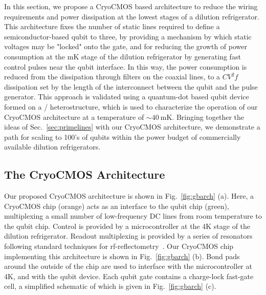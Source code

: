 In this section, we propose a CryoCMOS based architecture to reduce the wiring requirements and power dissipation at the lowest stages of a dilution refrigerator. This architecture
fixes the number of static lines required to define a semiconductor-based qubit to three, by providing a mechanism by which static voltages may be "locked" onto the gate, and for
reducing the growth of power consumption at the mK stage of the dilution refrigerator by generating fast control pulses near the qubit interface. In this way, the power
consumption is reduced from the dissipation through filters on the coaxial lines, to a $CV^2f$ dissipation set by the length of the interconnect between the qubit and the pulse
generator. This approach is validated using a quantum-dot based qubit device formed on a / heterostructure, which is used to characterize the operation of
our CryoCMOS architecture at a temperature of $\sim \SI{40}{\milli\kelvin}$. Bringing together the ideas of Sec.~\ref{sec:primelines} with our CryoCMOS architecture, we demonstrate
a path for scaling to 100's of qubits within the power budget of commercially available dilution refrigerators.

\subsection{The CryoCMOS Architecture}
\label{sec:gbarch}

Our proposed CryoCMOS architecture is shown in Fig.~\ref{fig:gbarch} (a). Here, a CryoCMOS chip (orange) acts as an interface to the qubit chip (green), multiplexing a small number
of low-frequency DC lines from room temperature to the qubit chip. Control is provided by a microcontroller at the 4K stage of the dilution refrigerator. Readout multiplexing is provided by a series of resonators~\cite{doi:10.1063/1.4868107} following standard techniques for rf-reflectometry~\cite{Reilly:2007ig,barthel2009rapid}. Our CryoCMOS chip implementing this architecture is shown in Fig.~\ref{fig:gbarch} (b). Bond pads around the outside of the chip are used to interface with the microcontroller at 4K, and with the qubit device. Each qubit gate contains a charge-lock fast-gate cell, a simplified schematic of which is given in Fig.~\ref{fig:gbarch} (c).


